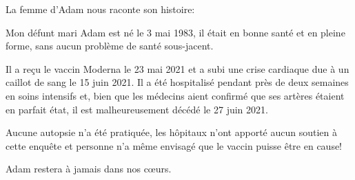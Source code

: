 La femme d'Adam nous raconte son histoire:

Mon défunt mari Adam est né le 3 mai 1983, il était en bonne santé et en pleine
forme, sans aucun problème de santé sous-jacent.

Il a reçu le vaccin Moderna le 23 mai 2021 et a subi une crise cardiaque due à
un caillot de sang le 15 juin 2021. Il a été hospitalisé pendant près de deux
semaines en soins intensifs et, bien que les médecins aient confirmé que ses
artères étaient en parfait état, il est malheureusement décédé le 27 juin 2021.

Aucune autopsie n'a été pratiquée, les hôpitaux n'ont apporté aucun soutien à
cette enquête et personne n'a même envisagé que le vaccin puisse être en cause!

Adam restera à jamais dans nos cœurs.

